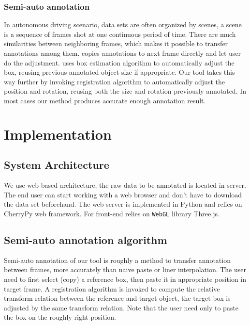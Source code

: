 \documentclass[letterpaper, 10 pt, conference]{ieeeconf}  %
\begin{document}
\subsubsection{Semi-auto annotation}
\label{semi-auto-anno}
In autonomous driving scenario, data sets are often organized by scenes\cite{Caesar2019nuScenesAM,Patil2019TheHD,lyft2019}, a scene is a sequence of frames shot at one continuous period of time. There are much similarities between neighboring frames, which makes it possible to transfer annotations among them. \cite{Zimmer20193DBA} copies annotations to next frame directly and let user do the adjustment.\cite{Wang2019LATTEAL} uses box estimation algorithm to automatically adjust the box, reusing previous annotated object size if appropriate. Our tool takes this way further by invoking registration algorithm \cite{Yang2016GoICPAG} to automatically adjust the position and rotation, reusing both the size and rotation previously annotated. In most cases our method produces  accurate enough annotation result.

\section{Implementation}
\label{Implementation}

\subsection{System Architecture}
We use web-based architecture, the raw data to be annotated is located in server. The end user can start working with a web browser and don't have to download the data set beforehand. The web server is implemented in Python and relies on CherryPy web framework\cite{cherrypy}. For front-end relies on \texttt{WebGL} library Three.js\cite{threejs}.


\subsection{Semi-auto annotation algorithm}

Semi-auto annotation of our tool is roughly a method to transfer annotation between frames, more accurately than naive paste or liner interpolation. The user need to first select (copy) a reference box, then paste it in appropriate position in target frame. A registration algorithm is invoked to compute the relative transform relation between the reference and target object, the target box is adjusted by the same transform relation. Note that the user need only to paste the box on the roughly right position.
\end{document}
